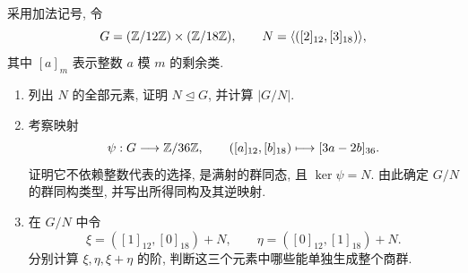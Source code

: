 \documentclass{article}
\begin{document}
\begin{problem}
采用加法记号, 令
\[
  G=(\mathbb{Z}/12\mathbb{Z})\times(\mathbb{Z}/18\mathbb{Z}),\qquad N=\langle([2]_{12},[3]_{18})\rangle,
\]
其中 $[a]_m$ 表示整数 $a$ 模 $m$ 的剩余类.
\begin{enumerate}
  \item[(a)] 列出 $N$ 的全部元素, 证明 $N\unlhd G$, 并计算 $|G/N|$.
  \item[(b)] 考察映射
  \[
    \psi:G\longrightarrow\mathbb{Z}/36\mathbb{Z},\qquad ([a]_{12},[b]_{18})\longmapsto[3a-2b]_{36}.
  \]
  证明它不依赖整数代表的选择, 是满射的群同态, 且 $\ker\psi=N$. 由此确定 $G/N$ 的群同构类型, 并写出所得同构及其逆映射.
  \item[(c)] 在 $G/N$ 中令
  \[
    \xi=([1]_{12},[0]_{18})+N,\qquad\eta=([0]_{12},[1]_{18})+N.
  \]
  分别计算 $\xi,\eta,\xi+\eta$ 的阶, 判断这三个元素中哪些能单独生成整个商群.
\end{enumerate}
\end{problem}
\end{document}
